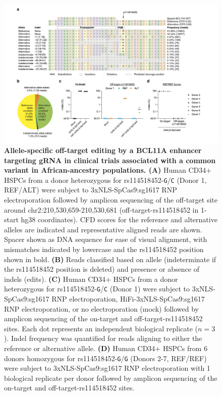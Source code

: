 \documentclass[a4paper, titlepage, openright]{book}
\begin{document}
\begin{figure}
	\centering
	\includegraphics[width=\textwidth]{figures/crisprme6.png}
	\caption[Allele-specific off-target editing by a BCL11A enhancer targeting gRNA in clinical trials associated with a common variant in African-ancestry populations]{\textbf{Allele-specific off-target editing by a BCL11A enhancer targeting gRNA in clinical trials associated with a common variant in African-ancestry populations. (A)} Human CD34+ HSPCs from a donor heterozygous for rs114518452-\texttt{G}/\texttt{C} (Donor 1, REF/ALT) were subject to 3xNLS-SpCas9:sg1617 RNP electroporation followed by amplicon sequencing of the off-target site around chr2:210,530,659-210,530,681 (off-target-rs114518452 in 1-start hg38 coordinates). CFD scores for the reference and alternative alleles are indicated and representative aligned reads are shown. Spacer shown as DNA sequence for ease of visual alignment, with mismatches indicated by lowercase and the rs114518452 position shown in bold. \textbf{(B)} Reads classified based on allele (indeterminate if the rs114518452 position is deleted) and presence or absence of indels (edits). \textbf{(C)} Human CD34+ HSPCs from a donor heterozygous for rs114518452-\texttt{G}/\texttt{C} (Donor 1) were subject to 3xNLS-SpCas9:sg1617 RNP electroporation, HiFi-3xNLS-SpCas9:sg1617 RNP electroporation, or no electroporation (mock) followed by amplicon sequencing of the on-target and off-target-rs114518452 sites. Each dot represents an independent biological replicate ($n = 3$). Indel frequency was quantified for reads aligning to either the reference or alternative allele. \textbf{(D)} Human CD34+ HSPCs from 6 donors homozygous for rs114518452-\texttt{G}/\texttt{G} (Donors 2-7, REF/REF) were subject to 3xNLS-SpCas9:sg1617 RNP electroporation with 1 biological replicate per donor followed by amplicon sequencing of the on-target and off-target-rs114518452 sites.}
	\label{fig:crisprme6}
\end{figure} 
\end{document}
